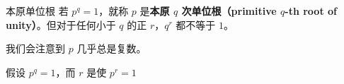 

\begin{definition}{本原单位根}
若 $p^q = 1$，就称 $p$ 是\textbf{本原 $q$ 次单位根（primitive $q$-th root of unity）}。但对于任何小于 $q$ 的正 $r$，$q^r$ 都不等于 $1$。
\end{definition}
我们会注意到 $p$ 几乎总是复数。

假设 $p^q=1$，而 $r$ 是使 $p^r=1$
